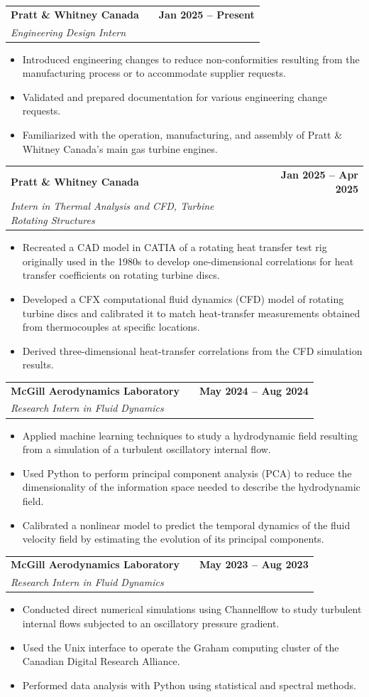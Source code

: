 \documentclass[letter,10pt]{article}
\makeatletter
\newenvironment{joblong}[3]
    {
    \begin{tabularx}{\linewidth}{@{}l X r@{}}
    \textbf{#1} & & \textbf{#3} \\[2pt]
    \textit{#2} & & \\[3.75pt]
    \end{tabularx}
    \begin{minipage}[t]{\linewidth}
    \begin{itemize}[nosep,after=\strut, leftmargin=1em, itemsep=3pt,label=--]
    }
    {
    \end{itemize}
    \end{minipage}
    }
\makeatother
\begin{document}
\begin{joblong}{Pratt \& Whitney Canada}{Engineering Design Intern}{Jan 2025 -- Present}
\item Introduced engineering changes to reduce non-conformities resulting from the manufacturing process or to accommodate supplier requests.
\item Validated and prepared documentation for various engineering change requests.
\item Familiarized with the operation, manufacturing, and assembly of Pratt \& Whitney Canada's main gas turbine engines.
\end{joblong}

\begin{joblong}{Pratt \& Whitney Canada}{Intern in Thermal Analysis and CFD, Turbine Rotating Structures}{Jan 2025 -- Apr 2025}
\item Recreated a CAD model in CATIA of a rotating heat transfer test rig originally used in the 1980s to develop one-dimensional correlations for heat transfer coefficients on rotating turbine discs.
\item Developed a CFX computational fluid dynamics (CFD) model of rotating turbine discs and calibrated it to match heat-transfer measurements obtained from thermocouples at specific locations.
\item Derived three-dimensional heat-transfer correlations from the CFD simulation results.
\end{joblong}

\begin{joblong}{McGill Aerodynamics Laboratory}{Research Intern in Fluid Dynamics}{May 2024 -- Aug 2024}
\item Applied machine learning techniques to study a hydrodynamic field resulting from a simulation of a turbulent oscillatory internal flow.
\item Used Python to perform principal component analysis (PCA) to reduce the dimensionality of the information space needed to describe the hydrodynamic field.
\item Calibrated a nonlinear model to predict the temporal dynamics of the fluid velocity field by estimating the evolution of its principal components.
\end{joblong}

\begin{joblong}{McGill Aerodynamics Laboratory}{Research Intern in Fluid Dynamics}{May 2023 -- Aug 2023}
\item Conducted direct numerical simulations using Channelflow to study turbulent internal flows subjected to an oscillatory pressure gradient.
\item Used the Unix interface to operate the Graham computing cluster of the Canadian Digital Research Alliance.
\item Performed data analysis with Python using statistical and spectral methods.
\end{joblong}
\end{document}
